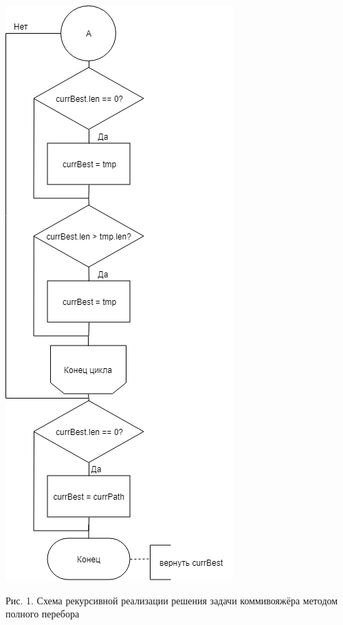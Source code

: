 \documentclass[12pt]{report}
\begin{document}
\begin{center}
		\includegraphics[scale=0.7]{Rec2.png}
		
		Рис. 1. Схема рекурсивной реализации решения задачи коммивояжёра методом полного перебора
		

\end{center}
\end{document}
